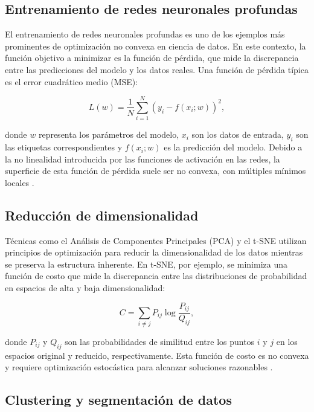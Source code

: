 \begin{itemize}
	\subsection{Entrenamiento de redes neuronales profundas}
	
	El entrenamiento de redes neuronales profundas es uno de los ejemplos más prominentes de optimización no convexa en ciencia de datos. En este contexto, la función objetivo a minimizar es la función de pérdida, que mide la discrepancia entre las predicciones del modelo y los datos reales. Una función de pérdida típica es el error cuadrático medio (MSE):
	
	\begin{equation}
		L(w) = \frac{1}{N} \sum_{i=1}^N (y_i - f(x_i; w))^2,
	\end{equation}
	
	donde \(w\) representa los parámetros del modelo, \(x_i\) son los datos de entrada, \(y_i\) son las etiquetas correspondientes y \(f(x_i; w)\) es la predicción del modelo. Debido a la no linealidad introducida por las funciones de activación en las redes, la superficie de esta función de pérdida suele ser no convexa, con múltiples mínimos locales \cite{lecun2015deep}.
	
	\subsection{Reducción de dimensionalidad}
	
	Técnicas como el Análisis de Componentes Principales (PCA) y el t-SNE utilizan principios de optimización para reducir la dimensionalidad de los datos mientras se preserva la estructura inherente. En t-SNE, por ejemplo, se minimiza una función de costo que mide la discrepancia entre las distribuciones de probabilidad en espacios de alta y baja dimensionalidad:
	
	\begin{equation}
		C = \sum_{i \neq j} P_{ij} \log \frac{P_{ij}}{Q_{ij}},
	\end{equation}
	
	donde \(P_{ij}\) y \(Q_{ij}\) son las probabilidades de similitud entre los puntos \(i\) y \(j\) en los espacios original y reducido, respectivamente. Esta función de costo es no convexa y requiere optimización estocástica para alcanzar soluciones razonables \cite{maaten2008visualizing}.
	
	\subsection{Clustering y segmentación de datos}
	

\end{itemize}

